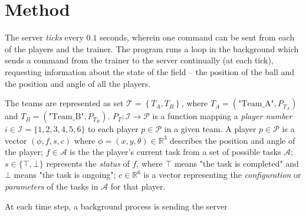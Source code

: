 \documentclass[10pt,a4paper]{article}
\begin{document}
\section{Method}

The server \textit{ticks} every \(0.1\) seconds, wherein one command can be sent from each of the players and the trainer. The program runs a loop in the background which sends a command from the trainer to the server continually (at each tick), requesting information about the state of the field -- the position of the ball and the position and angle of all the players.

The teams are represented as set \(\mathcal{T} = \left\{ T_A, T_B \right\}\), where \(T_A = (\text{"Team\_A"}, P_{T_A})\) and \(T_B = (\text{"Team\_B"}, P_{T_B})\). \(P_T : \mathcal{I} \to \mathcal{P} \) is a function mapping a \textit{player number} \(i\in \mathcal{I} = \{1,2,3,4,5, 6\}\) to each player \(p \in \mathcal{P}\) in a given team. A player \(p\in \mathcal{P}\) is a vector \((\phi, f, s, c)\) where \(\phi = (x, y, \theta) \in \mathbb{R}^3\) describes the position and angle of the player; \(f \in \mathcal{A}\) is the the player's current task from a set of possible tasks \(\mathcal{A}\); \(s \in \{\top,\bot\}\) represents the \textit{status} of \(f\), where \(\top\) means "the task is completed" and \(\bot\) means "the task is ongoing"; \(c \in \mathbb{R}^6\) is a vector representing the \textit{configuration} or \textit{parameters} of the tasks in \(\mathcal{A}\) for that player.

At each time step, a background process is sending the server
\end{document}
